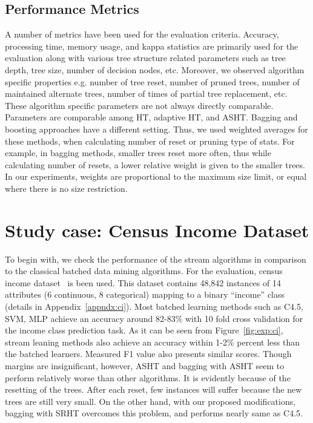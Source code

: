 \subsection{Performance Metrics}
A number of metrics have been used for the evaluation criteria. Accuracy, processing time, memory usage, and kappa statistics are primarily used for the evaluation along with various tree structure related parameters such as tree depth, tree size, number of decision nodes, etc. Moreover, we observed algorithm specific properties e.g. number of tree reset, number of pruned trees, number of maintained alternate trees, number of times of partial tree replacement, etc. These algorithm specific parameters are not always directly comparable. Parameters are comparable among HT, adaptive HT, and ASHT. Bagging and boosting approaches have a different setting. Thus, we used weighted averages for these methods, when calculating number of reset or pruning type of stats. For example, in bagging methods, smaller trees reset more often, thus while calculating number of resets, a lower relative weight is given to the smaller trees. In our experiments, weights are proportional to the maximum size limit, or equal where there is no size restriction.


\section{Study case: Census Income Dataset}
To begin with, we check the performance of the stream algorithms in comparison to the classical batched data mining algorithms. For the evaluation, census income dataset~\cite{ron:adultds} is been used. This dataset contains 48,842 instances of 14 attributes (6 continuous, 8 categorical) mapping to a binary ``income'' class (details in Appendix~\ref{appndx:ci}). Most batched learning methods such as C4.5, SVM, MLP achieve an accuracy around 82-83\% with 10 fold cross validation for the income class prediction task. As it can be seen from Figure~\ref{fig:exp:ci}, stream leaning methods also achieve an accuracy within 1-2\% percent less than the batched learners. Measured F1 value also presents similar scores. Though margins are insignificant, however, ASHT and bagging with ASHT seem to perform relatively worse than other algorithms. It is evidently because of the resetting of the trees. After each reset, few instances will suffer because the new trees are still very small. On the other hand, with our proposed modifications, bagging with SRHT overcomes this problem, and performs nearly same as C4.5.

